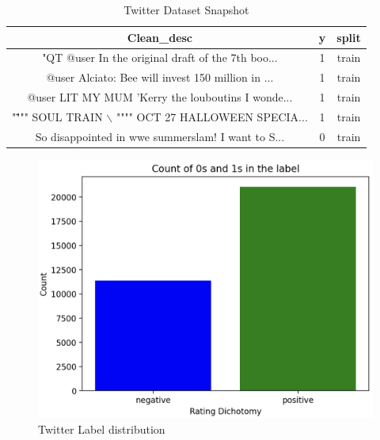 \documentclass{article}
\begin{document}
\begin{table}[!ht]
    \centering
    \begin{tabular}{|c|c|c|}
    \hline Clean\_desc & y & split \\
    \hline "QT @user In the original draft of the 7th boo... & 1 & train \\
    \hline @user Alciato: Bee will invest 150 million in ... & 1 & train \\
    \hline @user LIT MY MUM 'Kerry the louboutins I wonde... & 1 & train \\
    \hline "\"""" SOUL TRAIN $\backslash$ """" OCT 27 HALLOWEEN SPECIA... & 1 & train \\
    \hline So disappointed in wwe summerslam! I want to S... & 0 & train \\
    \hline
    \end{tabular}
    \caption{Twitter Dataset Snapshot}
    \label{tab:twitter}
\end{table}
\begin{figure}[!ht]
    \centering
    \includegraphics[width=0.5\linewidth]{twitter.png}
    \caption{Twitter Label distribution}
    \label{fig:twitter dist}
\end{figure}
\end{document}
